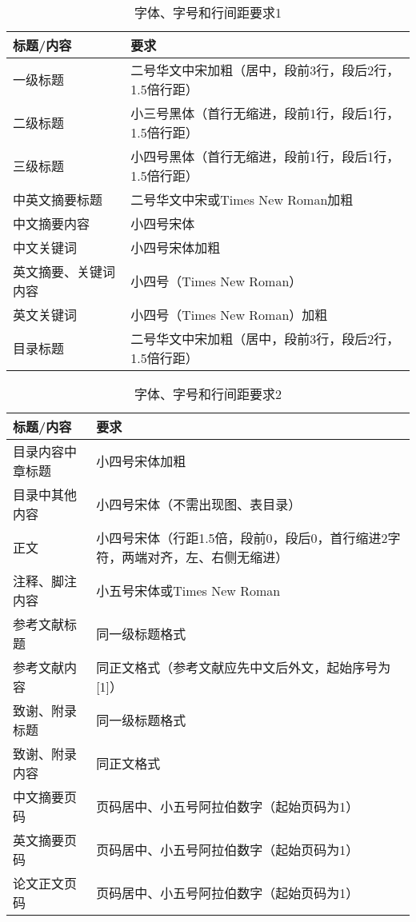 \begin{table}[htb]
\caption{字体、字号和行间距要求1}
\label{tab:字体、字号和行间距要求1}
\centering
\renewcommand{\arraystretch}{1}
\begin{tabularx}{\textwidth}{LL}
\toprule
\textbf{标题/内容} & \textbf{要求} \\
\midrule
一级标题 & 二号华文中宋加粗（居中，段前3行，段后2行，1.5倍行距） \\
二级标题 & 小三号黑体（首行无缩进，段前1行，段后1行，1.5倍行距） \\
三级标题 & 小四号黑体（首行无缩进，段前1行，段后1行，1.5倍行距） \\
中英文摘要标题 & 二号华文中宋或Times New Roman加粗 \\
中文摘要内容 & 小四号宋体 \\
中文关键词 & 小四号宋体加粗 \\
英文摘要、关键词内容 & 小四号（Times New Roman） \\
英文关键词 & 小四号（Times New Roman）加粗 \\
目录标题 & 二号华文中宋加粗（居中，段前3行，段后2行，1.5倍行距） \\
\bottomrule
\end{tabularx}
\end{table}

\begin{table}[htb]
\caption{字体、字号和行间距要求2}
\label{tab:字体、字号和行间距要求2}
\centering
\renewcommand{\arraystretch}{1}
\begin{tabularx}{\textwidth}{LL}
\toprule
\textbf{标题/内容} & \textbf{要求} \\
\midrule
目录内容中章标题 & 小四号宋体加粗 \\
目录中其他内容 & 小四号宋体（不需出现图、表目录） \\
正文 & 小四号宋体（行距1.5倍，段前0，段后0，首行缩进2字符，两端对齐，左、右侧无缩进） \\
注释、脚注内容 & 小五号宋体或Times New Roman \\
参考文献标题 & 同一级标题格式 \\
参考文献内容 & 同正文格式（参考文献应先中文后外文，起始序号为[1]） \\
致谢、附录标题 & 同一级标题格式 \\
致谢、附录内容 & 同正文格式 \\
中文摘要页码 & 页码居中、小五号阿拉伯数字（起始页码为1） \\
英文摘要页码 & 页码居中、小五号阿拉伯数字（起始页码为1） \\
论文正文页码 & 页码居中、小五号阿拉伯数字（起始页码为1） \\
\bottomrule
\end{tabularx}
\end{table}



